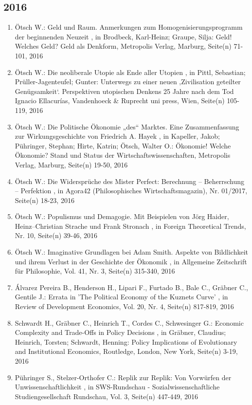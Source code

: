  \subsection*{2016} 
 \begin{enumerate}[leftmargin=*, labelsep=0.5cm] 
	 \item Ötsch W.:  Geld und Raum. Anmerkungen zum Homogenisierungsprogramm der beginnenden Neuzeit  , in Brodbeck, Karl-Heinz; Graupe, Silja: Geld! Welches Geld? Geld als Denkform, Metropolis Verlag, Marburg, Seite(n) 71-101, 2016
	 \item Ötsch W.:  Die neoliberale Utopie als Ende aller Utopien  , in Pittl, Sebastian; Prüller-Jagenteufel; Gunter: Unterwegs zu einer neuen ‚Zivilisation geteilter Genügsamkeit‘. Perspektiven utopischen Denkens 25 Jahre nach dem Tod Ignacio Ellacurías, Vandenhoeck & Ruprecht uni press, Wien, Seite(n) 105-119, 2016
	 \item Ötsch W.:  Die Politische Ökonomie „des“ Marktes. Eine Zusammenfassung zur Wirkungsgeschichte von Friedrich A. Hayek  , in Kapeller, Jakob; Pühringer, Stephan; Hirte, Katrin; Ötsch, Walter O.: Ökonomie! Welche Ökonomie? Stand und Status der Wirtschaftswissenschaften, Metropolis Verlag, Marburg, Seite(n) 19-50, 2016
	 \item Ötsch W.:  Die Widersprüche des Mister Perfect: Berechnung – Beherrschung – Perfektion  , in Agora42 (Philosophisches Wirtschaftsmagazin), Nr. 01/2017, Seite(n) 18-23, 2016
	 \item Ötsch W.:  Populismus und Demagogie. Mit Beispielen von Jörg Haider, Heinz–Christian Strache und Frank Stronach  , in Foreign Theoretical Trends, Nr. 10, Seite(n) 39-46, 2016
	 \item Ötsch W.:  Imaginative Grundlagen bei Adam Smith. Aspekte von Bildlichkeit und ihrem Verlust in der Geschichte der Ökonomik  , in Allgemeine Zeitschrift für Philosophie, Vol. 41, Nr. 3, Seite(n) 315-340, 2016
	 \item Álvarez Pereira B., Henderson H., Lipari F., Furtado B., Bale C., Gräbner C., Gentile J.:  Errata in 'The Political Economy of the Kuznets Curve'  , in Review of Development Economics, Vol. 20, Nr. 4, Seite(n) 817-819, 2016
	 \item Schwardt H., Gräbner C., Heinrich T., Cordes C., Schwesinger G.:  Economic Complexity and Trade-Offs in Policy Decisions  , in Gräbner, Claudius; Heinrich, Torsten; Schwardt, Henning: Policy Implications of Evolutionary and Institutional Economics, Routledge, London, New York, Seite(n) 3-19, 2016
	 \item Pühringer S., Stelzer-Orthofer C.:  Replik zur Replik: Von Vorwürfen der Unwissenschaftlichkeit  , in SWS-Rundschau - Sozialwissenschaftliche Studiengesellschaft Rundschau, Vol. 3, Seite(n) 447-449, 2016

\end{enumerate}
